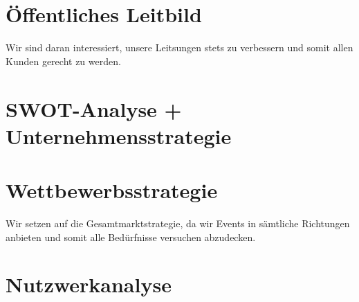 \documentclass[a4paper, titlepage]{article}
\begin{document}
\section{Öffentliches Leitbild}
Wir sind daran interessiert, unsere Leitsungen stets zu verbessern und somit allen Kunden gerecht zu werden.
\section{SWOT-Analyse + Unternehmensstrategie}

\section{Wettbewerbsstrategie}
Wir setzen auf die Gesamtmarktstrategie, da wir Events in sämtliche Richtungen anbieten und somit alle Bedürfnisse versuchen abzudecken.

\section{Nutzwerkanalyse}
\end{document}
